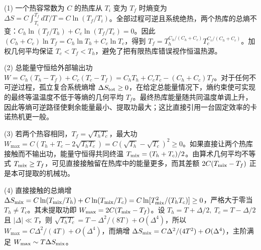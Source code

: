 (1) 一个热容常数为 \(C\) 的热库从 \(T_i\) 变为 \(T_f\) 时熵变为 \(\Delta S=C\int_{T_i}^{T_f}dT/T=C\ln(T_f/T_i)\)。全部过程可逆且系统绝热，两个热库的总熵不变：\(C_h\ln(T_f/T_h)+C_c\ln(T_f/T_c)=0\)。因此 \((C_h+C_c)\ln T_f=C_h\ln T_h+C_c\ln T_c\)，得到 \(T_f=T_h^{C_h/(C_h+C_c)}T_c^{C_c/(C_h+C_c)}\)。加权几何平均保证 \(T_c<T_f<T_h\)，避免了把有限热库错误视作恒温热源。

(2) 总能量守恒给外部输出功 \(W=C_h(T_h-T_f)+C_c(T_c-T_f)=C_hT_h+C_cT_c-(C_h+C_c)T_f\)。对于任何不可逆过程，孤立复合系统熵增 \(\Delta S_{\rm tot}\ge0\)，在给定总能量情况下，熵约束使可实现的最终等温温度不低于等熵的几何平均 \(T_f\)。最终热库能量随共同温度单调上升，因此等熵可逆路径使剩余能量最小、提取功最大；这比直接引用一台固定效率的卡诺热机更一般。

(3) 若两个热容相同，\(T_f=\sqrt{T_hT_c}\)，最大功 \(W_{\max}=C(T_h+T_c-2\sqrt{T_hT_c})=C(\sqrt{T_h}-\sqrt{T_c})^2\ge0\)。如果直接让两个热库接触而不输出功，能量守恒得共同终温 \(T_{\rm mix}=(T_h+T_c)/2\)。由算术几何平均不等式 \(T_{\rm mix}\ge T_f\)，可见直接接触留在热库中的能量更多，而其差额 \(2C(T_{\rm mix}-T_f)\) 正是本可提取的机械功。

(4) 直接接触的总熵增 \(\Delta S_{\rm mix}=C\ln(T_{\rm mix}/T_h)+C\ln(T_{\rm mix}/T_c)=C\ln[T_{\rm mix}^2/(T_hT_c)]\ge0\)，严格大于零当 \(T_h\ne T_c\)。其未提取功即 \(W_{\max}=2C(T_{\rm mix}-T_f)\)。设 \(T_h=T+\Delta/2,\ T_c=T-\Delta/2\) 且 \(|\Delta|\ll T\)，则 \(\sqrt{T_hT_c}=T-\Delta^2/(8T)+O(\Delta^4)\)，所以 \(W_{\max}=C\Delta^2/(4T)+O(\Delta^4)\)，而熵增 \(\Delta S_{\rm mix}=C\Delta^2/(4T^2)+O(\Delta^4)\)，主阶满足 \(W_{\max}\sim T\Delta S_{\rm mix}\)。
